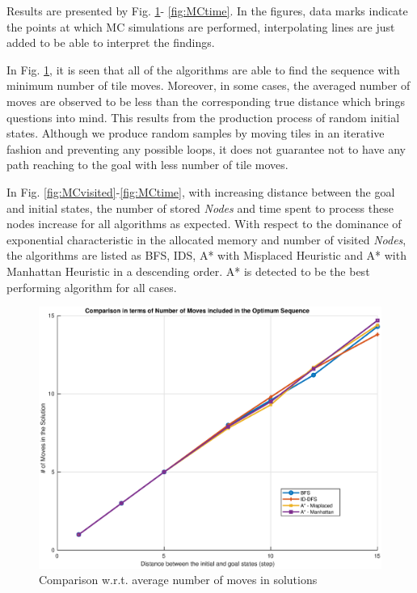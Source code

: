 \documentclass[12pt]{article}
\begin{document}
\begin{enumerate}
\begin{enumerate}
		Results are presented by Fig. \ref{fig:MCmove}- \ref{fig:MCtime}. 
		In the figures, data marks indicate the points at which MC simulations are performed, interpolating lines are just added to be able to interpret the findings.
		
		In Fig. \ref{fig:MCmove}, it is seen that all of the algorithms are able to find the sequence with minimum number of tile moves. 
		Moreover, in some cases, the averaged number of moves are observed to be less than the corresponding true distance which brings questions into mind.
		This results from the production process of random initial  states. 
		Although we produce random samples by moving tiles in an iterative fashion and preventing any possible loops, it does not guarantee not to have any path reaching to the goal with less number of tile moves.
		
		In Fig. \ref{fig:MCvisited}-\ref{fig:MCtime}, with increasing distance between the goal and initial states, the number of stored \textit{Nodes} and time spent to process these nodes increase for all algorithms as expected. 
		With respect to the dominance of exponential characteristic in the allocated memory and number of visited \textit{Nodes}, the algorithms are listed as BFS, IDS, A* with Misplaced Heuristic and A* with Manhattan Heuristic in a descending order.
		A* is detected to be the best performing algorithm for all cases.
		
	\end{enumerate}


	\begin{figure}[htb]
		\centering
		\includegraphics[width=1\columnwidth]{images/Q8_numMoves.eps}
		\caption{Comparison w.r.t. average number of moves in solutions}
		\label{fig:MCmove}
	\end{figure}


\end{enumerate}
\end{document}
